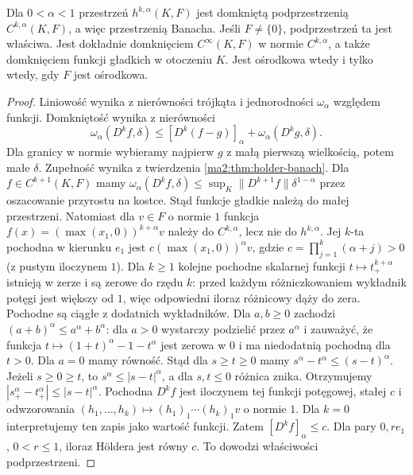 \begin{twierdzenie}
\label{ma2:thm:little-holder-closure}
Dla $0<\alpha<1$ przestrzeń $h^{k,\alpha}(K,F)$
jest domkniętą podprzestrzenią
$C^{k,\alpha}(K,F)$, a więc przestrzenią Banacha.
Jeśli $F\ne\{0\}$, podprzestrzeń ta jest właściwa.
Jest dokładnie domknięciem $C^\infty(K,F)$
w normie $C^{k,\alpha}$, a także domknięciem
funkcji gładkich w otoczeniu $K$.
Jest ośrodkowa wtedy i tylko wtedy,
gdy $F$ jest ośrodkowa.
\end{twierdzenie}
\begin{proof}
Liniowość wynika z nierówności trójkąta
i jednorodności $\omega_\alpha$ względem funkcji.
Domkniętość wynika z nierówności
\[
 \omega_\alpha(D^kf,\delta)
 \le [D^k(f-g)]_\alpha+
              \omega_\alpha(D^kg,\delta).
\]
Dla granicy w normie wybieramy najpierw $g$
z małą pierwszą wielkością, potem małe $\delta$.
Zupełność wynika z twierdzenia
\ref{ma2:thm:holder-banach}.
Dla $f\in C^{k+1}(K,F)$ mamy
$\omega_\alpha(D^kf,\delta)
\le\sup_K\|D^{k+1}f\|\delta^{1-\alpha}$
przez oszacowanie przyrostu na kostce.
Stąd funkcje gładkie należą do małej przestrzeni.
Natomiast dla $v\in F$ o normie $1$ funkcja
$f(x)=(\max(x_1,0))^{k+\alpha}v$
należy do $C^{k,\alpha}$, lecz nie do $h^{k,\alpha}$.
Jej $k$-ta pochodna w kierunku $e_1$ jest
$c(\max(x_1,0))^\alpha v$, gdzie
$c=\prod_{j=1}^k(\alpha+j)>0$
(z pustym iloczynem $1$).
Dla $k\ge1$ kolejne pochodne skalarnej
funkcji $t\mapsto t_+^{k+\alpha}$ istnieją
w zerze i są zerowe do rzędu $k$: przed
każdym różniczkowaniem wykładnik potęgi
jest większy od $1$, więc odpowiedni
iloraz różnicowy dąży do zera.
Pochodne są ciągłe z dodatnich wykładników.
Dla $a,b\ge0$ zachodzi
$(a+b)^\alpha\le a^\alpha+b^\alpha$:
dla $a>0$ wystarczy podzielić przez $a^\alpha$
i zauważyć, że funkcja
$t\mapsto(1+t)^\alpha-1-t^\alpha$
jest zerowa w $0$ i ma niedodatnią pochodną
dla $t>0$. Dla $a=0$ mamy równość.
Stąd dla $s\ge t\ge0$ mamy
$s^\alpha-t^\alpha\le(s-t)^\alpha$.
Jeżeli $s\ge0\ge t$, to $s^\alpha\le|s-t|^\alpha$,
a dla $s,t\le0$ różnica znika. Otrzymujemy
$|s_+^\alpha-t_+^\alpha|\le|s-t|^\alpha$.
Pochodna $D^kf$ jest iloczynem tej funkcji
potęgowej, stałej $c$ i odwzorowania
$(h_1,\ldots,h_k)\mapsto
(h_1)_1\cdots(h_k)_1v$ o normie $1$.
Dla $k=0$ interpretujemy ten zapis jako
wartość funkcji. Zatem $[D^kf]_\alpha\le c$.
Dla pary $0,re_1$, $0<r\le1$, iloraz
H\"oldera jest równy $c$.
To dowodzi właściwości podprzestrzeni.


\end{proof}
